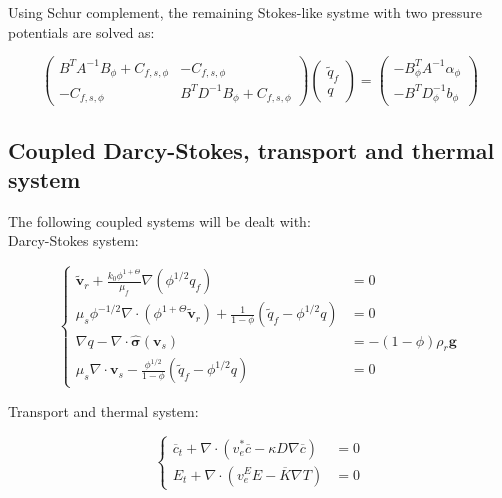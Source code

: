 Using Schur complement, the remaining Stokes-like systme with two pressure potentials 
are solved as:

\begin{equation*}
		  \begin{pmatrix}
					 B^TA^{-1}B_{\phi} + C_{f,s,\phi} & -C_{f,s,\phi}\\
					 -C_{f,s,\phi} & B^TD^{-1}B_{\phi} + C_{f,s,\phi}
		  \end{pmatrix} \begin{pmatrix}
        \tilde{q}_f \\
					 q
		  \end{pmatrix} = \begin{pmatrix}
         -B^T_{\phi}A^{-1} \alpha_\phi \\
					 -B^TD^{-1}_\phi b_\phi
		  \end{pmatrix}
\end{equation*}

\newpage

\subsection{Coupled Darcy-Stokes, transport and thermal system}

The following coupled systems will be dealt with:\\

Darcy-Stokes system:

\begin{equation*}
					 \left \{
					 \begin{aligned}
								\tilde{\boldsymbol v}_r + \frac{k_0 \phi^{1+\Theta}}{\mu_f}\nabla (\phi^{1/2} q_f) &= 0\\
								\mu_s \phi^{-1/2} \nabla \cdot (\phi^{1+\Theta}\tilde{\boldsymbol v}_r) + \frac{1}{1-\phi}(\tilde{q}_f-\phi^{1/2}q) &=0 \\
								\nabla q - \nabla \cdot \hat{\boldsymbol \sigma}(\boldsymbol v_s) &= -(1-\phi)\rho_r \boldsymbol g\\
								\mu_s \nabla \cdot \boldsymbol v_s - \frac{\phi^{1/2}}{1-\phi}(\tilde{q}_f-\phi^{1/2}q) &=0
					 \end{aligned}
					 \right .
\end{equation*}

Transport and thermal system:

\begin{equation*}
		  \left \{
					 \begin{aligned}
								\overline{c}_t + \nabla \cdot (v_e^* \overline{c} - \kappa D \nabla \overline{c}) &= 0\\
								E_t + \nabla \cdot (v_e^E E - \overline{K}\nabla T) &= 0
					 \end{aligned}
					 \right .
\end{equation*}


